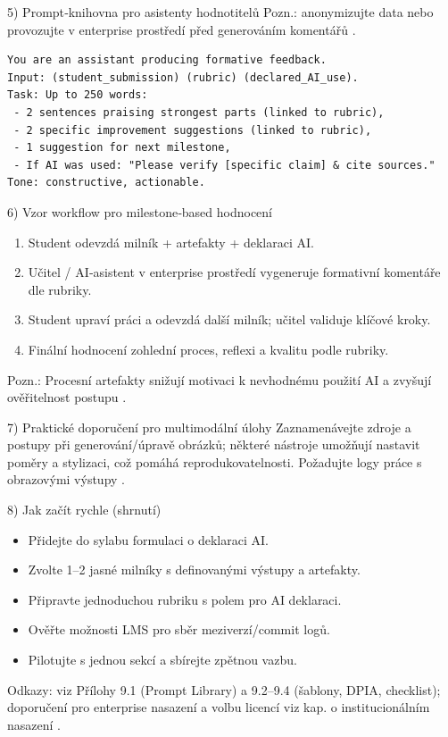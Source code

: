 5) Prompt‑knihovna pro asistenty hodnotitelů
Pozn.: anonymizujte data nebo provozujte v enterprise prostředí před generováním komentářů \cite{kb_ai_101_tipu_pdf_04e4a115_page_15_2}.
\begin{verbatim}
You are an assistant producing formative feedback.
Input: (student_submission) (rubric) (declared_AI_use).
Task: Up to 250 words:
 - 2 sentences praising strongest parts (linked to rubric),
 - 2 specific improvement suggestions (linked to rubric),
 - 1 suggestion for next milestone,
 - If AI was used: "Please verify [specific claim] & cite sources."
Tone: constructive, actionable.
\end{verbatim}

6) Vzor workflow pro milestone‑based hodnocení
\begin{enumerate}
  \item Student odevzdá milník + artefakty + deklaraci AI.
  \item Učitel / AI‑asistent v enterprise prostředí vygeneruje formativní komentáře dle rubriky.
  \item Student upraví práci a odevzdá další milník; učitel validuje klíčové kroky.
  \item Finální hodnocení zohlední proces, reflexi a kvalitu podle rubriky.
\end{enumerate}
Pozn.: Procesní artefakty snižují motivaci k nevhodnému použití AI a zvyšují ověřitelnost postupu \cite{kb_ai_101_tipu_pdf_04e4a115_page_8_1}.

7) Praktické doporučení pro multimodální úlohy
Zaznamenávejte zdroje a postupy při generování/úpravě obrázků; některé nástroje umožňují nastavit poměry a stylizaci, což pomáhá reprodukovatelnosti. Požadujte logy práce s obrazovými výstupy \cite{kb_ai_101_tipu_pdf_04e4a115_page_51_1}.

8) Jak začít rychle (shrnutí)
\begin{itemize}
  \item Přidejte do sylabu formulaci o deklaraci AI.
  \item Zvolte 1–2 jasné milníky s definovanými výstupy a artefakty.
  \item Připravte jednoduchou rubriku s polem pro AI deklaraci.
  \item Ověřte možnosti LMS pro sběr meziverzí/commit logů.
  \item Pilotujte s jednou sekcí a sbírejte zpětnou vazbu.
\end{itemize}

Odkazy: viz Přílohy 9.1 (Prompt Library) a 9.2–9.4 (šablony, DPIA, checklist); doporučení pro enterprise nasazení a volbu licencí viz kap. o institucionálním nasazení \cite{kb_ai_101_tipu_pdf_04e4a115_page_15_2,kb_ai_101_tipu_pdf_04e4a115_page_8_1}.